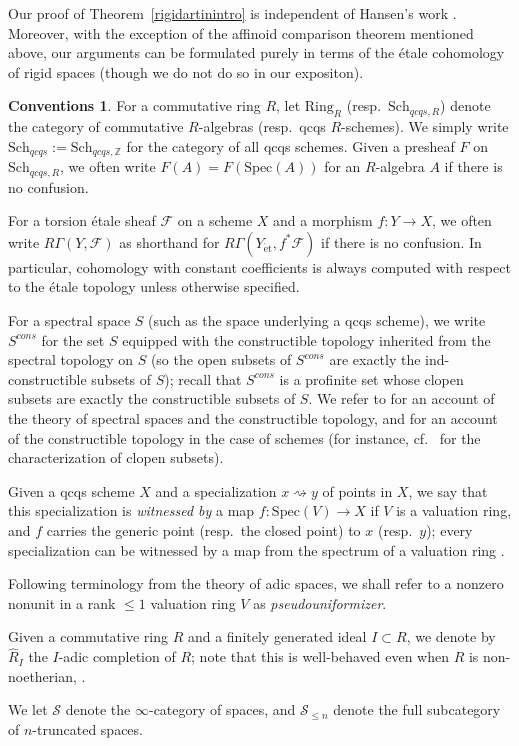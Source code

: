 \documentclass[reqno]{amsart}
\newcommand{\spec}{\mathrm{Spec}}
\newcommand{\et}{\mathrm{\acute{e}t}}
\theoremstyle{definition}
\newtheorem*{convention*}{Conventions}
\begin{document}
Our proof of Theorem~\ref{rigidartinintro} is independent of Hansen's work \cite{HansenArtin}. Moreover, with the exception of the affinoid comparison theorem mentioned above, our arguments can be formulated purely in terms of the \'etale cohomology of rigid spaces (though we do not do so in our expositon).



\begin{convention*}
For a commutative ring $R$, let $\mathrm{Ring}_R$
(resp.~$\mathrm{Sch}_{qcqs,R}$) denote the category of commutative $R$-algebras
(resp.~qcqs $R$-schemes). We simply write $\mathrm{Sch}_{qcqs} := \mathrm{Sch}_{qcqs,\mathbb{Z}}$ for the category of all qcqs schemes. Given a presheaf $F$ on $\mathrm{Sch}_{qcqs,R}$, we often write $F(A) = F(\spec(A))$ for an $R$-algebra $A$ if there is no confusion.

For a torsion \'etale sheaf $\mathcal{F}$ on a scheme $X$ and a morphism $f\colon Y \to X$, we often write $R\Gamma(Y,\mathcal{F})$ as shorthand for $R\Gamma(Y_{\et}, f^* \mathcal{F})$ if there is no confusion. In particular, cohomology with constant coefficients is always computed with respect to the \'etale topology unless otherwise specified.

For a spectral space $S$ (such as the space underlying a qcqs scheme), we write
$S^{cons}$ for the set $S$ equipped with the constructible topology inherited
from the spectral topology on $S$ (so the open subsets of $S^{cons}$ are exactly
the ind-constructible subsets of $S$); recall that $S^{cons}$ is a profinite set
whose clopen subsets are exactly the constructible subsets of $S$. We refer to 
\cite[Tag 08YF]{stacks-project} for an account of the theory of spectral spaces
and the constructible topology, and \cite[Sec.~1.9]{EGAIV} for an account of the
constructible topology in the
case of schemes (for instance, cf.~\cite[Prop.~1.9.11]{EGAIV} for the characterization of
clopen subsets). 

Given a qcqs scheme $X$ and a specialization $x \rightsquigarrow y$ of points in
$X$, we say that this specialization is {\em witnessed by} a map $f\colon
\mathrm{Spec}(V) \to X$ if $V$ is a valuation ring, and $f$ carries the generic
point (resp.~the closed point) to $x$ (resp.~$y$); every specialization can be witnessed by a map from the spectrum of a valuation ring \cite[Tag 00IA]{stacks-project}.

Following terminology from the theory of adic spaces, we shall refer to a nonzero nonunit in a rank $\leq 1$ valuation ring $V$ as {\em pseudouniformizer}.

Given a commutative ring $R$ and a finitely generated ideal $I \subset R$, we
denote by $\hat{R}_I$ the $I$-adic completion of $R$; note that this is
well-behaved even when $R$ is non-noetherian, \cite[Tag 00M9]{stacks-project}. 

We let $\mathcal{S}$ denote the $\infty$-category of spaces, and
$\mathcal{S}_{\leq n}$ denote the full subcategory of $n$-truncated spaces.
\end{convention*}
\end{document}
